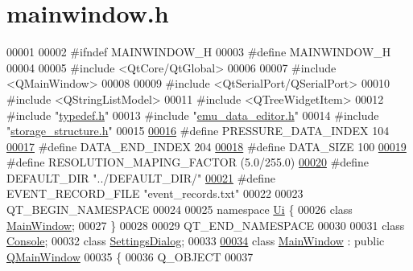 \hypertarget{a00039_source}{\section{mainwindow.\+h}
\label{a00039_source}
}

\begin{DoxyCode}
00001 
00002 \textcolor{preprocessor}{#ifndef MAINWINDOW\_H}
00003 \textcolor{preprocessor}{#define MAINWINDOW\_H}
00004 
00005 \textcolor{preprocessor}{#include <QtCore/QtGlobal>}
00006 
00007 \textcolor{preprocessor}{#include <QMainWindow>}
00008 
00009 \textcolor{preprocessor}{#include <QtSerialPort/QSerialPort>}
00010 \textcolor{preprocessor}{#include <QStringListModel>}
00011 \textcolor{preprocessor}{#include <QTreeWidgetItem>}
00012 \textcolor{preprocessor}{#include "\hyperlink{a00001}{typedef.h}"}
00013 \textcolor{preprocessor}{#include "\hyperlink{a00036}{emu\_data\_editor.h}"}
00014 \textcolor{preprocessor}{#include "\hyperlink{a00003}{storage\_structure.h}"}
00015 
\hypertarget{a00039_source_l00016}{}\hyperlink{a00039_a56c4aa163f5d0c550eeb89fdb3f08996}{00016} \textcolor{preprocessor}{#define PRESSURE\_DATA\_INDEX 104}
\hypertarget{a00039_source_l00017}{}\hyperlink{a00039_a61d054f24da5242788747ba3db5dfa11}{00017} \textcolor{preprocessor}{#define DATA\_END\_INDEX 204}
\hypertarget{a00039_source_l00018}{}\hyperlink{a00039_af55149bc1f05cf18af067a302e31e3f9}{00018} \textcolor{preprocessor}{#define DATA\_SIZE 100}
\hypertarget{a00039_source_l00019}{}\hyperlink{a00039_a58055d345f4a971dad22c043135fb214}{00019} \textcolor{preprocessor}{#define RESOLUTION\_MAPING\_FACTOR  (5.0/255.0)}
\hypertarget{a00039_source_l00020}{}\hyperlink{a00039_a63ec0cea9c1f0ca8a7893c2c53d2fd81}{00020} \textcolor{preprocessor}{#define DEFAULT\_DIR             "../DEFAULT\_DIR/"}
\hypertarget{a00039_source_l00021}{}\hyperlink{a00039_a8d4ad2cd60e024f6e0f37dbac40768a1}{00021} \textcolor{preprocessor}{#define EVENT\_RECORD\_FILE       "event\_records.txt"}
00022 
00023 QT\_BEGIN\_NAMESPACE
00024 
00025 \textcolor{keyword}{namespace }\hyperlink{a00055}{Ui} \{
00026 \textcolor{keyword}{class }\hyperlink{a00006}{MainWindow};
00027 \}
00028 
00029 QT\_END\_NAMESPACE
00030 
00031 \textcolor{keyword}{class }\hyperlink{a00002}{Console};
00032 \textcolor{keyword}{class }\hyperlink{a00022}{SettingsDialog};
00033 
\hypertarget{a00039_source_l00034}{}\hyperlink{a00006}{00034} \textcolor{keyword}{class }\hyperlink{a00006}{MainWindow} : \textcolor{keyword}{public} \hyperlink{a00010}{QMainWindow}
00035 \{
00036     Q\_OBJECT
00037 

\end{DoxyCode}
